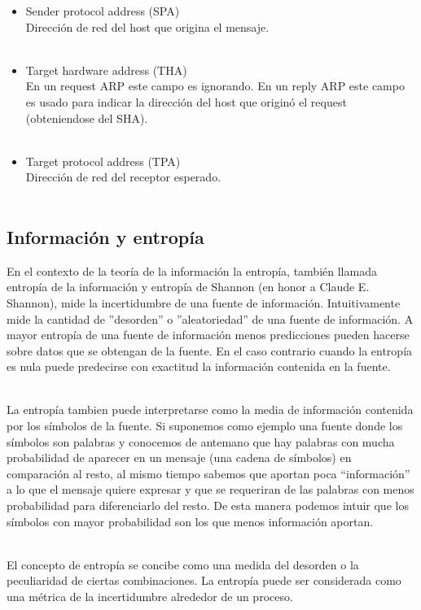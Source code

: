 \begin{itemize}
   
\item Sender protocol address (SPA) \\
    Direcci\'on de red del host que origina el mensaje. \\\
    
\item Target hardware address (THA) \\
    En un request ARP este campo es ignorando. En un reply ARP este campo es usado para indicar la direcci\'on del host que origin\'o el request (obteniendose del SHA).\\\

\item Target protocol address (TPA) \\
   	Direcci\'on de red del receptor esperado. \\\
\end{itemize}




\subsection{Informaci\'on y entrop\'ia}
En el contexto de la teor\'ia de la informaci\'on la entrop\'ia, tambi\'en llamada entrop\'ia de la informaci\'on y entrop\'ia de Shannon (en honor a Claude E. Shannon), mide la incertidumbre de una fuente de informaci\'on. Intuitivamente mide la cantidad de ''desorden'' o ''aleatoriedad'' de una fuente de informaci\'on. A mayor entrop\'ia de una fuente de informaci\'on menos predicciones pueden hacerse sobre datos que se obtengan de la fuente. En el caso contrario cuando la entrop\'ia es nula puede predecirse con exactitud la informaci\'on contenida en la fuente. \\\

La entrop\'ia tambien puede interpretarse como la media de informaci\'on contenida por los s\'imbolos de la fuente. Si suponemos como ejemplo una fuente donde los s\'imbolos son palabras y conocemos de antemano que hay palabras con mucha probabilidad de aparecer en un mensaje (una cadena de s\'imbolos) en comparaci\'on al resto, al mismo tiempo sabemos que aportan poca ``informaci\'on'' a lo que el mensaje quiere expresar y que se requeriran de las palabras con menos probabilidad para diferenciarlo del resto. De esta manera podemos intuir que los s\'imbolos con mayor probabilidad son los que menos informaci\'on aportan. \\\

El concepto de entrop\'ia se concibe como una medida del desorden o la peculiaridad de ciertas combinaciones. La entrop\'ia puede ser considerada como una m\'etrica de la incertidumbre alrededor de un proceso.\\\


